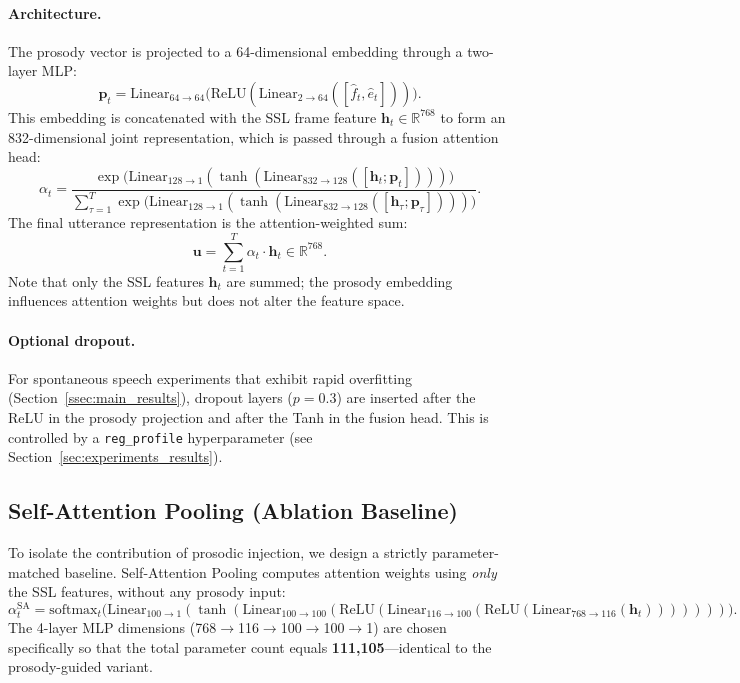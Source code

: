 \paragraph{Architecture.}
The prosody vector is projected to a 64-dimensional embedding through a two-layer MLP:
\begin{equation}
\mathbf{p}_t = \text{Linear}_{64 \to 64}\bigl(\text{ReLU}(\text{Linear}_{2 \to 64}([\hat{f}_t, \hat{e}_t]))\bigr).
\label{eq:prosody_proj}
\end{equation}
This embedding is concatenated with the SSL frame feature $\mathbf{h}_t \in \mathbb{R}^{768}$ to form an 832-dimensional joint representation, which is passed through a fusion attention head:
\begin{equation}
\alpha_t = \frac{\exp\bigl(\text{Linear}_{128 \to 1}(\tanh(\text{Linear}_{832 \to 128}([\mathbf{h}_t; \mathbf{p}_t])))\bigr)}{\sum_{\tau=1}^{T} \exp\bigl(\text{Linear}_{128 \to 1}(\tanh(\text{Linear}_{832 \to 128}([\mathbf{h}_\tau; \mathbf{p}_\tau])))\bigr)}.
\label{eq:attn_weights}
\end{equation}
The final utterance representation is the attention-weighted sum:
\begin{equation}
\mathbf{u} = \sum_{t=1}^{T} \alpha_t \cdot \mathbf{h}_t \in \mathbb{R}^{768}.
\label{eq:pooled}
\end{equation}
Note that only the SSL features $\mathbf{h}_t$ are summed; the prosody embedding influences attention weights but does not alter the feature space.

\paragraph{Optional dropout.}
For spontaneous speech experiments that exhibit rapid overfitting (Section~\ref{ssec:main_results}), dropout layers ($p=0.3$) are inserted after the ReLU in the prosody projection and after the Tanh in the fusion head.
This is controlled by a \texttt{reg\_profile} hyperparameter (see Section~\ref{sec:experiments_results}).

\subsection{Self-Attention Pooling (Ablation Baseline)}
\label{ssec:self_attn_pooling}

To isolate the contribution of prosodic injection, we design a strictly parameter-matched baseline.
Self-Attention Pooling computes attention weights using \emph{only} the SSL features, without any prosody input:
\begin{equation}
\alpha_t^{\text{SA}} = \text{softmax}_t\bigl(\text{Linear}_{100 \to 1}(\tanh(\text{Linear}_{100 \to 100}(\text{ReLU}(\text{Linear}_{116 \to 100}(\text{ReLU}(\text{Linear}_{768 \to 116}(\mathbf{h}_t)))))))\bigr).
\label{eq:self_attn}
\end{equation}
The 4-layer MLP dimensions (768$\to$116$\to$100$\to$100$\to$1) are chosen specifically so that the total parameter count equals \textbf{111,105}---identical to the prosody-guided variant.


